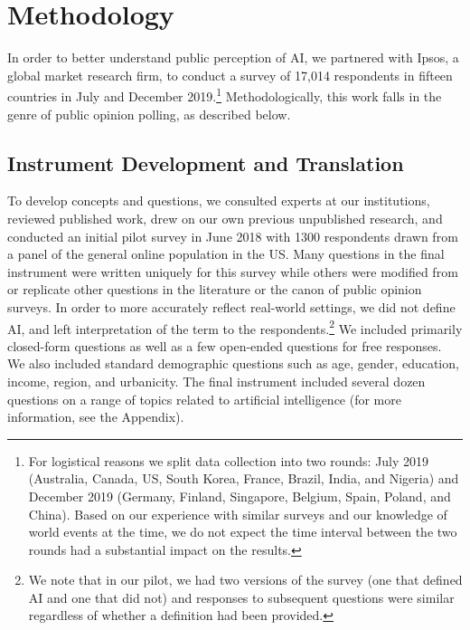 \documentclass[11pt]{article} %
\begin{document}
\section{Methodology}
In order to better understand public perception of AI, 
we partnered with Ipsos, a global market research firm, 
to conduct a survey of 17,014 respondents in fifteen countries in July and December 2019.\footnote{For logistical reasons we split data collection into two rounds: July 2019 (Australia, Canada, US, South Korea, France, Brazil, India, and Nigeria) and December 2019 (Germany, Finland, Singapore, Belgium, Spain, Poland, and China). Based on our experience with similar surveys and our knowledge of world events at the time, we do not expect the time interval between the two rounds had a substantial impact on the results.}
Methodologically, this work falls in the genre of public opinion polling, as described below.

\subsection{Instrument Development and Translation}
To develop concepts and questions, we consulted experts at our institutions, reviewed published work, drew on our own previous unpublished research, and conducted an initial pilot survey in June 2018 with 1300 respondents drawn from a panel of the general online population in the US. Many questions in the final instrument were written uniquely for this survey while others were modified from or replicate other questions in the literature or the canon of public opinion surveys. In order to more accurately reflect real-world settings, we did not define AI, and left interpretation of the term to the respondents.\footnote{We note that in our pilot, we had two versions of the survey (one that defined AI and one that did not) and responses to subsequent questions were similar regardless of whether a definition had been provided.} We included primarily closed-form questions as well as a few open-ended questions for free responses. We also included standard demographic questions such as age, gender, education, income, region, and urbanicity. The final instrument included several dozen questions on a range of topics related to artificial intelligence (for more information, see the Appendix). 
\end{document}
